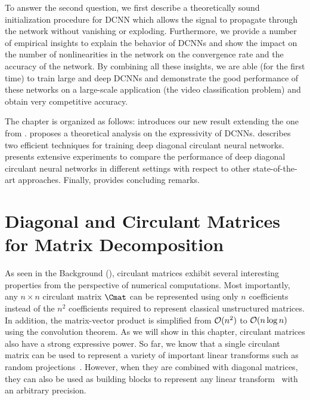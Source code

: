 To answer the second question, we first describe a theoretically sound initialization procedure for DCNN which allows the signal to propagate through the network without vanishing or exploding.
Furthermore, we provide a number of empirical insights to explain the behavior of DCNNs and show the impact on the number of nonlinearities in the network on the convergence rate and the accuracy of the network. 
By combining all these insights, we are able (for the first time) to train large and deep DCNNs and demonstrate the good performance of these networks on a large-scale application (the \yt video classification problem) and obtain very competitive accuracy. 

The chapter is organized as follows:
 introduces our new result extending the one from \citet{huhtanen2015factoring}.
 proposes a theoretical analysis on the expressivity of DCNNs.
 describes two efficient techniques for training deep diagonal circulant neural networks.
 presents extensive experiments to compare the performance of deep diagonal circulant neural networks in different settings with respect to other state-of-the-art approaches.
Finally,  provides concluding remarks.




\section{Diagonal and Circulant Matrices for Matrix Decomposition}
\label{section:ch4-diagonal_and_circulant_matrices_for_matrix_decomposition}

As seen in the Background (), circulant matrices exhibit several interesting properties from the perspective of numerical computations.
Most importantly, any $n \times n$ circulant matrix $\Cmat$ can be represented using only $n$ coefficients instead of the $n^2$ coefficients required to represent classical unstructured matrices.
In addition, the matrix-vector product is simplified from $\mathcal{O}(n^2)$ to $\mathcal{O}(n \log n)$ using the  convolution theorem.
As we will show in this chapter, circulant matrices also have a strong expressive power.
So far, we know that a single circulant matrix can be used to represent a variety of important linear transforms such as random projections~\cite{hinrichs2011johnson}. 
However, when they are combined with diagonal matrices, they can also be used as building blocks to represent any linear transform~\cite{schmid2000decomposing,huhtanen2015factoring} with an arbitrary precision.

